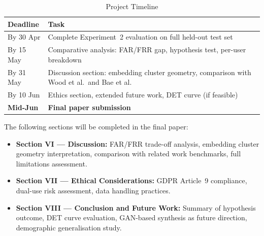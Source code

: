 \documentclass[conference]{IEEEtran}
\begin{document}
\begin{table}[H]
\centering
\caption{Project Timeline}
\label{tab:timeline}
\renewcommand{\arraystretch}{1.3}
\begin{tabular}{p{1.8cm}p{5.5cm}}
\toprule
\textbf{Deadline} & \textbf{Task} \\
\midrule
By 30 Apr & Complete Experiment~2 evaluation on full held-out test set \\
\midrule
By 15 May & Comparative analysis: FAR/FRR gap, hypothesis test, per-user breakdown \\
\midrule
By 31 May & Discussion section: embedding cluster geometry, comparison with Wood et al.\ and Bae et al. \\
\midrule
By 10 Jun & Ethics section, extended future work, DET curve (if feasible) \\
\midrule
\textbf{Mid-Jun} & \textbf{Final paper submission} \\
\bottomrule
\end{tabular}
\end{table}

The following sections will be completed in the final paper:
\begin{itemize}
    \item \textbf{Section VI — Discussion:} FAR/FRR trade-off analysis, embedding cluster geometry interpretation, comparison with related work benchmarks, full limitations assessment.
    \item \textbf{Section VII — Ethical Considerations:} GDPR Article~9 compliance, dual-use risk assessment, data handling practices.
    \item \textbf{Section VIII — Conclusion and Future Work:} Summary of hypothesis outcome, DET curve evaluation, GAN-based synthesis as future direction, demographic generalisation study.
\end{itemize}
\end{document}
